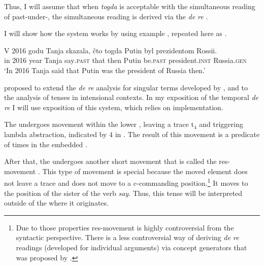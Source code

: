 \documentclass[output=paper,modfonts,newtxmath,hidelinks]{langscibook}
\begin{document}
Thus, I will assume that when \textit{togda} is acceptable with the simultaneous reading of past-under-, the simultaneous reading is derived via the \textit{de re} .

I will show how the system works by using example , repeated here as .

\ea \label{20:ex34}
\gll V 2016 godu Tanja skazala, čto togda Putin byl prezidentom Rossii.\\
     in 2016 year Tanja say\textsc{.past} that then Putin be\textsc{.past} president\textsc{.inst} Russia.\textsc{gen}\\
\glt `In 2016 Tanja said that Putin was the president of Russia then.'
\z

\noindent \citeauthor{Abusch1997} proposed to extend the \textit{de re} analysis for singular terms developed by \citet{Kaplan1969}, \citet{Lewis1979} and \citet{Cresswell-vonStechow1982} to the analysis of tenses in intensional contexts. In my exposition of the temporal \textit{de re}  I will use  exposition of this system, which relies on  implementation.

The  undergoes movement within the lower , leaving a trace t$_4$ and triggering lambda abstraction, indicated by $4$ in . The result of this movement is a predicate of times in the embedded .

After that, the  undergoes another short movement that is called the res-movement \citep{Heim1994}. This type of movement is special because the moved element does not leave a trace and does not move to a c-commanding position.\footnote{\label{20:fn10}Due to those properties res-movement is highly controversial from the syntactic perspective. There is a less controversial way of deriving \textit{de re} readings (developed for individual arguments) via concept generators that was proposed by \citet{PercusSauerland2003}.} It moves to the position of the sister of the verb \textit{say}. Thus, this tense will be interpreted outside of the  where it originates.\largerpage[-3]
\end{document}
